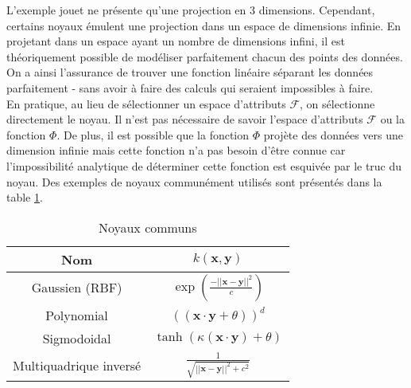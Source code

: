 L'exemple jouet ne présente qu’une projection en 3 dimensions. Cependant, certains noyaux émulent une projection dans un espace de dimensions infinie. 
En projetant dans un espace ayant un nombre de dimensions infini, il est théoriquement possible de modéliser 
parfaitement chacun des points des données. On a ainsi l’assurance de trouver une fonction linéaire séparant les 
données parfaitement - sans avoir à faire des calculs qui seraient impossibles à faire.\\

En pratique, au lieu de sélectionner un espace d'attributs $\mathcal{F}$, on sélectionne directement le noyau. 
Il n'est pas nécessaire de savoir l'espace d'attributs $\mathcal{F}$ ou la fonction $\Phi$. De plus, 
il est possible que la fonction $\Phi$ projète des données vers une dimension infinie mais cette fonction 
n'a pas besoin d’être connue car l'impossibilité analytique de déterminer cette fonction est esquivée par 
le truc du noyau. Des exemples de noyaux communément utilisés sont présentés dans la table \ref{tab:kernels}.

\begin{table}[H]
	\centering
\begin{tabular}{|c|c|}
	\hline
	         Nom           &                  $k(\textbf{x}, \textbf{y})$                  \\ \hline
	    Gaussien (RBF)     & $\exp \left(\frac{-|| \textbf{x} - \textbf{y}||^2}{c}\right)$ \\ \hline
	      Polynomial       &         $((\textbf{x} \cdot \textbf{y} + \theta))^d$          \\ \hline
	     Sigmodoidal       &    $\tanh (\kappa (\textbf{x} \cdot \textbf{y}) + \theta)$    \\ \hline
	Multiquadrique inversé &     $\frac{1}{\sqrt{||\textbf{x}-\textbf{y}||^2 + c^2}}$      \\ \hline
\end{tabular} 
\caption{Noyaux communs}
\label{tab:kernels}
\end{table}
